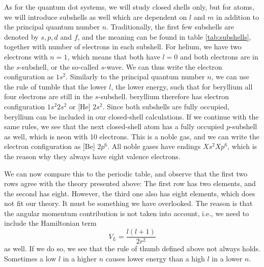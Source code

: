 As for the quantum dot systems, we will study closed shells only, but for atoms, we will introduce subshells as well which are dependent on $l$ and $m$ in addition to the principal quantum number $n$. Traditionally, the first few subshells are denoted by $s, p, d$ and $f$, and the meaning can be found in table \eqref{tab:subshells}, together with number of electrons in each subshell. For helium, we have two electrons with $n=1$, which means that both have $l=0$ and both electrons are in the $s$-subshell, or the so-called $s$-wave. We can thus write the electron configuration as $1s^2$. Similarly to the principal quantum number $n$, we can use the rule of tumble that the lower $l$, the lower energy, such that for beryllium all four electrons are still in the $s$-subshell. beryllium therefore has electron configuration $1s^2 2s^2$ or [He] $2s^2$. Since both subshells are fully occupied, beryllium can be included in our closed-shell calculations. If we continue with the same rules, we see that the next closed-shell atom has a fully occupied $p$-subshell as well, which is neon with 10 electrons. This is a noble gas, and we can write the electron configuration as [Be] $2p^6$. All noble gases have endings $Xs^2 Xp^6$, which is the reason why they always have eight valence electrons.

We can now compare this to the periodic table, and observe that the first two rows agree with the theory presented above: The first row has two elements, and the second has eight. However, the third one also has eight elements, which does not fit our theory. It must be something we have overlooked. The reason is that the angular momentum contribution is not taken into account, i.e., we need to include the Hamiltonian term
\begin{equation}
V_L=\frac{l(l+1)}{2r^2}
\end{equation}
as well. If we do so, we see that the rule of thumb defined above not always holds. Sometimes a low $l$ in a higher $n$ causes lower energy than a high $l$ in a lower $n$.

